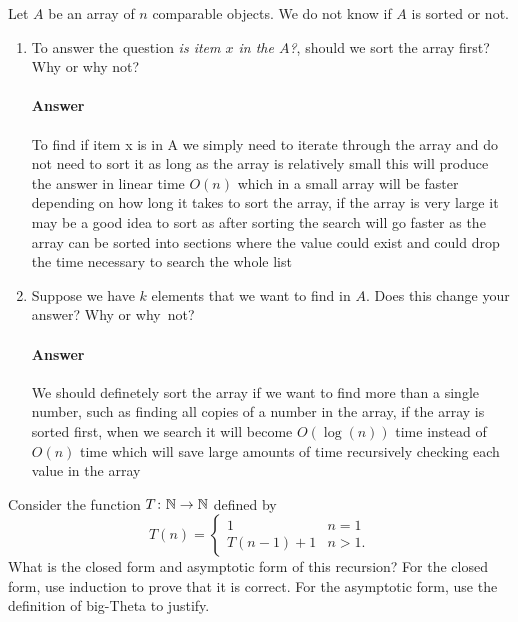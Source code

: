 \documentclass{article}
\begin{document}
Let $A$ be an array of $n$ comparable objects.  We do not know if $A$ is sorted
or not.

\begin{enumerate}
	\item To answer the question \emph{is item $x$ in the $A$?}, should we
	      sort the array first?  Why or why not?

	      \paragraph{Answer}

To find if item x is in A we simply need to iterate through the array and do not need to sort it as long as the array is relatively small
this will produce the answer in linear time $O(n)$ which in a small array will be faster depending on how long it takes to sort the array, if the array
is very large it may be a good idea to sort as after sorting the search will go faster as the array can be sorted into sections where the value could exist and
could drop the time necessary to search the whole list

	\item Suppose we have $k$ elements that we want to find in $A$. Does this
	      change your answer? Why or why~not?

	      \paragraph{Answer}

We should definetely sort the array if we want to find more than a single number, such as finding all copies of a number in the array,
if the array is sorted first, when we search it will become $O(\log(n))$ time instead of $O(n)$ time which will save large amounts of time recursively
checking each value in the array

\end{enumerate}

Consider the function $T \colon {\mathbb N} \to {\mathbb N}$ defined by
\[T (n) = \begin{cases}
		1        & n=1  \\
		T(n-1)+1 & n>1.
	\end{cases}
\]
What is the closed form and asymptotic form of this recursion?  For the
closed form, use induction to prove that it is correct.  For the asymptotic
form, use the definition of big-Theta to justify.
\end{document}
